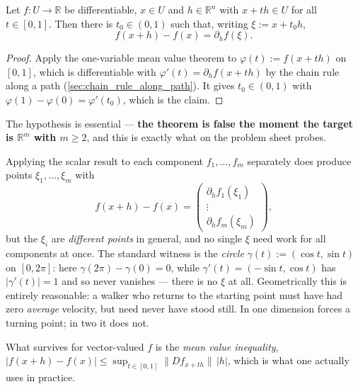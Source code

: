 \begin{theorem}
\label{thm:mean_value_theorem}
Let $f : U \to \mathbb{R}$ be differentiable, $x \in U$ and $h \in \mathbb{R}^n$ with
$x+th \in U$ for all $t \in [0,1]$. Then there is $t_0 \in (0,1)$ such that, writing
$\xi := x+t_0h$,
\[f(x+h)-f(x) = \partial_hf(\xi).\]
\end{theorem}

\begin{proof}
Apply the one-variable mean value theorem to $\varphi(t) := f(x+th)$ on $[0,1]$, which is
differentiable with $\varphi'(t) = \partial_hf(x+th)$ by the chain rule along a path
(\cref{sec:chain_rule_along_path}). It gives $t_0 \in (0,1)$ with
$\varphi(1)-\varphi(0) = \varphi'(t_0)$, which is the claim.
\end{proof}

\begin{importantremark}
\label{rem:mvt_fails_vector_valued}
The hypothesis  is essential --- \textbf{the theorem is false the
moment the target is $\mathbb{R}^m$ with $m \geq 2$}, and this is exactly what
 on the problem sheet probes.

Applying the scalar result to each component $f_1,\dots,f_m$ separately does produce points
$\xi_1,\dots,\xi_m$ with
\[f(x+h)-f(x) = \begin{pmatrix}\partial_hf_1(\xi_1) \\ \vdots \\ \partial_hf_m(\xi_m)\end{pmatrix},\]
but the $\xi_i$ are \emph{different points} in general, and no single $\xi$ need work for all
components at once. The standard witness is the \emph{circle}
$\gamma(t) := (\cos t, \sin t)$ on $[0,2\pi]$: here $\gamma(2\pi)-\gamma(0) = 0$, while
$\gamma'(t) = (-\sin t,\cos t)$ has $|\gamma'(t)| = 1$ and so never vanishes --- there is no
$\xi$ at all. Geometrically this is entirely reasonable: a walker who returns to the starting
point must have had zero \emph{average} velocity, but need never have stood still. In one
dimension  forces a turning point; in two it does not.

What survives for vector-valued $f$ is the \emph{mean value inequality},
$|f(x+h)-f(x)| \leq \sup_{t\in[0,1]}\lVert Df_{x+th}\rVert\,|h|$, which is what one actually
uses in practice.
\end{importantremark}

